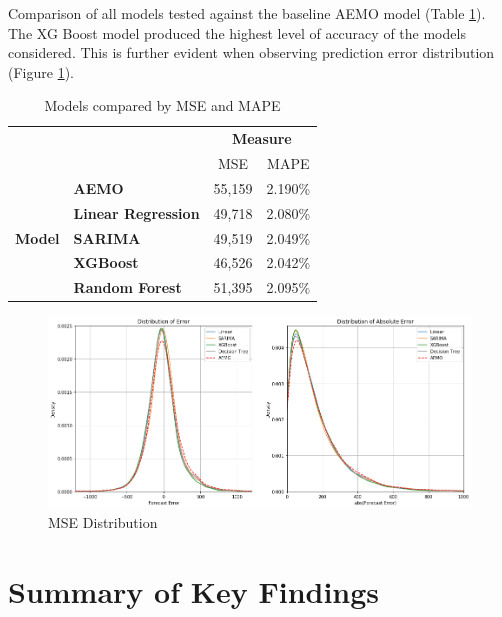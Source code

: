 \documentclass[mstat,12pt]{unswthesis}
\begin{document}
Comparison of all models tested against the baseline AEMO model (Table \ref{tab:tab8}). The XG Boost model produced the highest level of accuracy of the models considered. This is further evident when observing prediction error distribution (Figure \ref{fig:Cpmparison}).

\begin{table}[H]
\caption{Models compared by MSE and MAPE}
\centering
\begin{tabular}{|ll|cc|}
\hline
\multicolumn{2}{|l|}{\multirow{2}{*}{}} & \multicolumn{2}{c|}{\textbf{Measure}} \\ \cline{3-4} 
\multicolumn{2}{|l|}{} & \multicolumn{1}{c|}{MSE} & MAPE \\ \hline
\multicolumn{1}{|l|}{\multirow{5}{*}{\textbf{Model}}} & {\textbf{AEMO}} & \multicolumn{1}{c|}{{55,159}} & {2.190\%} \\ \cline{2-4} 
\multicolumn{1}{|l|}{} & \textbf{Linear Regression} & \multicolumn{1}{c|}{49,718} & 2.080\% \\ \cline{2-4} 
\multicolumn{1}{|l|}{} & \textbf{SARIMA} & \multicolumn{1}{c|}{49,519} & 2.049\% \\ \cline{2-4} 
\multicolumn{1}{|l|}{} & \textbf{XGBoost} & \multicolumn{1}{c|}{46,526} & 2.042\% \\ \cline{2-4} 
\multicolumn{1}{|l|}{} & \textbf{Random Forest} & \multicolumn{1}{c|}{51,395} & 2.095\% \\ \hline
\end{tabular}
\label{tab:tab8}
\end{table}

\begin{figure}
\includegraphics[width=1\linewidth,height=0.3\textheight]{images/Comparison} \caption{MSE Distribution}\label{fig:Cpmparison}
\end{figure}

\section{Summary of Key Findings}\label{summary-of-key-findings-1}
\end{document}

